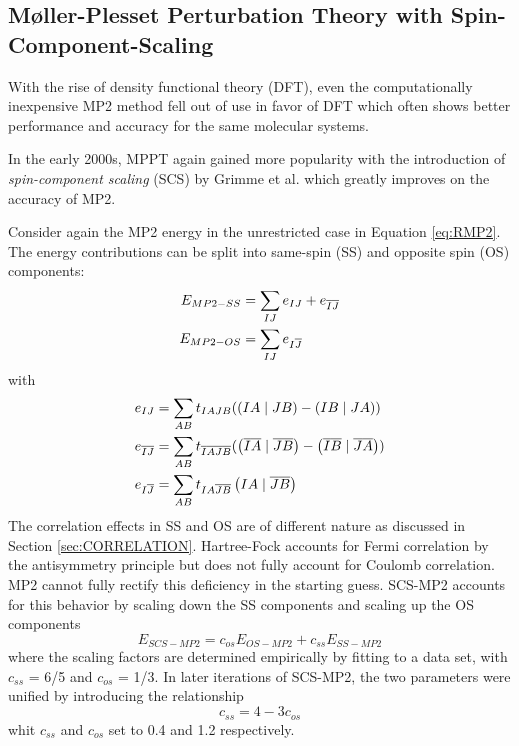 \subsection{M{\o}ller-Plesset Perturbation Theory with Spin-Component-Scaling \label{sec:SCSMP2}}

With the rise of density functional theory (DFT), even the computationally inexpensive MP2 method fell out of use in favor of DFT which often shows better performance and accuracy for the same molecular systems.

In the early 2000s, MPPT again gained more popularity with the introduction of \emph{spin-component scaling} (SCS) by Grimme et al. \cite{Gri2003,Gri2012} which greatly improves on the accuracy of MP2.

Consider again the MP2 energy in the unrestricted case in Equation \ref{eq:RMP2}. The energy contributions can be split into same-spin (SS) and opposite spin (OS) components:
\begin{align}
E_{MP2-SS} &= \sum_{IJ} e_{IJ} + e_{\overline{I}\overline{J}} \\
E_{MP2-OS} &= \sum_{IJ} e_{I\overline{J}} 
\end{align}
\noindent with
\begin{align}
e_{IJ} &= \sum_{AB} t_{IAJB} (\left( IA \mid JB \right) - \left( IB \mid JA \right)) \\
e_{\overline{I}\overline{J}} &= \sum_{AB} t_{\overline{I}\overline{A}\overline{J}\overline{B}} (\left( \overline{I}\overline{A} \mid \overline{J}\overline{B} \right) - \left( \overline{I}\overline{B} \mid \overline{J}\overline{A} \right)) \\
e_{I\overline{J}} &= \sum_{AB} t_{IA\overline{J}\overline{B}} \left( IA \mid \overline{J}\overline{B} \right)  
\end{align}
The correlation effects in SS and OS are of different nature as discussed in Section \ref{sec:CORRELATION}. Hartree-Fock accounts for Fermi correlation by the antisymmetry principle but does not fully account for Coulomb correlation. MP2 cannot fully rectify this deficiency in the starting guess. SCS-MP2 accounts for this behavior by scaling down the SS components and scaling up the OS components
\begin{equation}
E_{SCS-MP2} = c_{os} E_{OS-MP2} + c_{ss} E_{SS-MP2}
\end{equation}
\noindent where the scaling factors are determined empirically by fitting to a data set, with $c_{ss}$ = 6/5 and $c_{os}$ = 1/3. In later iterations of SCS-MP2, the two parameters were unified by introducing the relationship
\begin{equation}
c_{ss} = 4 - 3c_{os}
\end{equation}
\noindent whit $c_{ss}$ and $c_{os}$ set to 0.4 and 1.2 respectively.

